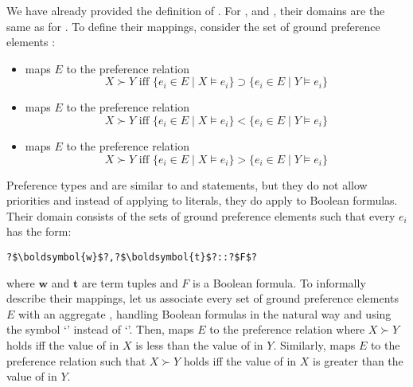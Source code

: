 We have already provided the definition of . 
For ,  and , their domains are the same as for .
To define their mappings, consider the set of ground preference elements :
\begin{itemize}
\item
{} maps $E$ to the preference relation
\[
X \succ Y \text{ iff } \{e_i\in E\mid X\models e_i\}\supset\{e_i\in E\mid Y\models e_i\}
\]
\item
{} maps $E$ to the preference relation
\[
X \succ Y \text{ iff } \{e_i\in E\mid X\models e_i\}<\{e_i\in E\mid Y\models e_i\}
\]
\item
{} maps $E$ to the preference relation
\[
X \succ Y \text{ iff } \{e_i\in E\mid X\models e_i\}>\{e_i\in E\mid Y\models e_i\}
\]
\end{itemize}

Preference types  and 
are similar to  and  statements,
but they do not allow priorities and 
instead of applying to literals, they do apply to  Boolean formulas.
Their domain consists of the sets of ground preference elements 
 such that every $e_i$ has the form:
\begin{lstlisting}[numbers=none,escapechar=?]
?$\boldsymbol{w}$?,?$\boldsymbol{t}$?::?$F$?
\end{lstlisting}
where $\boldsymbol{w}$ and $\boldsymbol{t}$ are term tuples and $F$ is a Boolean formula. 
To informally describe their mappings, let us
associate every set of ground preference elements $E$ with an aggregate , 
handling Boolean formulas in the natural way and 
using the symbol `\code{::}' instead of `\code{:}'.
Then,  maps $E$ to the preference relation where $X \succ Y$ holds 
iff the value of  in $X$ is less than the value of  in $Y$.
Similarly,  maps $E$ to the preference relation such that $X \succ Y$ holds iff
the value of  in $X$ is greater than the value of  in $Y$.


